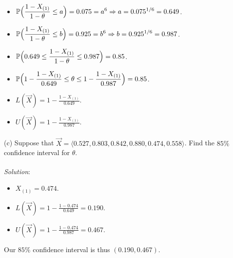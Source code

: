 \documentclass[12pt]{article}
\newcommand{\ds}{\displaystyle}
\begin{document}
\begin{itemize}
    \item $ \ds \mathbb{P} \Bigl( \frac{1 - X_{(1)}}{1 - \theta} \le a \Bigr) = 0.075 = a^{6} \Rightarrow a = 0.075^{1/6} = 0.649 $. \\
    \item $ \ds \mathbb{P} \Bigl( \frac{1 - X_{(1)}}{1 - \theta} \le b \Bigr) = 0.925 = b^{6} \Rightarrow b = 0.925^{1/6} = 0.987 $. \\
    \item $ \ds \mathbb{P} \Bigl( 0.649 \le \frac{1 - X_{(1)}}{1 - \theta} \le 0.987 \Bigr) = 0.85 $. \\
    \item $ \ds \mathbb{P} \Bigl( 1 - \frac{1- X_{(1)}}{0.649} \le \theta \le 1 - \frac{1- X_{(1)}}{0.987} \Bigr) = 0.85 $. \\
    \item $ \ds L(\overrightarrow{X}) = 1 - \frac{1- X_{(1)}}{0.649} $. \\
    \item $ \ds U(\overrightarrow{X}) = 1 - \frac{1- X_{(1)}}{0.987} $. \\
\end{itemize}

\vspace{2.5mm}

(c) Suppose that $ \overrightarrow{X} = \langle 0.527, 0.803, 0.842, 0.880, 0.474, 0.558 \rangle $.
Find the $ 85\% $ confidence interval for $ \theta $. \\
\vspace{2.5mm} \\
\textit{Solution}:
\vspace{2.5mm} \\

\begin{itemize}
    \item $ \ds X_{(1)} = 0.474 $. \\
    \item $ \ds L(\overrightarrow{X}) = 1 - \frac{1- 0.474}{0.649} = 0.190 $. \\
    \item $ \ds U(\overrightarrow{X}) = 1 - \frac{1- 0.474}{0.987} = 0.467 $. \\
\end{itemize}

\noindent
Our $ 85\% $ confidence interval is thus $ (0.190, 0.467) $. \\
\end{document}
